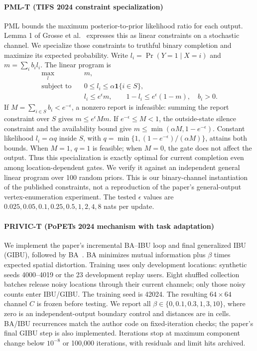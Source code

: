 \documentclass[3p,times]{elsarticle}
\newcommand{\ind}{\mathbf{1}}
\begin{document}
\paragraph{PML-T (TIFS 2024 constraint specialization)}
PML bounds the maximum posterior-to-prior likelihood ratio for each output. Lemma 1 of Grosse et al.~\cite{pml2024} expresses this as linear constraints on a stochastic channel. We specialize those constraints to truthful binary completion and maximize its expected probability. Write $l_i=\Pr(Y=1\mid X=i)$ and $m=\sum_i b_i l_i$. The linear program is
\begin{equation}
\begin{aligned}
 \max_l\quad & m,\\
 \text{subject to}\quad &0\le l_i\le\alpha\ind\{i\in S\},\\
 &l_i\le e^\epsilon m,\qquad 1-l_i\le e^\epsilon(1-m),\quad b_i>0.
\end{aligned}
\label{eq:pml}
\end{equation}
If $M=\sum_{i\in S}b_i<e^{-\epsilon}$, a nonzero report is infeasible: summing the report constraint over $S$ gives $m\le e^\epsilon M m$. If $e^{-\epsilon}\le M<1$, the outside-state silence constraint and the availability bound give $m\le\min(\alpha M,1-e^{-\epsilon})$. Constant likelihood $l_i=\alpha q$ inside $S$, with $q=\min\{1,(1-e^{-\epsilon})/(\alpha M)\}$, attains both bounds. When $M=1$, $q=1$ is feasible; when $M=0$, the gate does not affect the output. Thus this specialization is exactly optimal for current completion even among location-dependent gates. We verify it against an independent general linear program over 100 random priors. This is our binary-channel instantiation of the published constraints, not a reproduction of the paper's general-output vertex-enumeration experiment. The tested $\epsilon$ values are $0.025,0.05,0.1,0.25,0.5,1,2,4,8$ nats per update.

\paragraph{PRIVIC-T (PoPETs 2024 mechanism with task adaptation)}
We implement the paper's incremental BA--IBU loop and final generalized IBU (GIBU), followed by BA~\cite{privic2024}. BA minimizes mutual information plus $\beta$ times expected spatial distortion. Training uses only development locations: synthetic seeds 4000--4019 or the 23 development replay users. Eight shuffled collection batches release noisy locations through their current channels; only those noisy counts enter IBU/GIBU. The training seed is 42024. The resulting $64\times64$ channel $C$ is frozen before testing. We report all $\beta\in\{0,0.1,0.3,1,3,10\}$, where zero is an independent-output boundary control and distances are in cells. BA/IBU recurrences match the author code on fixed-iteration checks; the paper's final GIBU step is also implemented. Iterations stop at maximum component change below $10^{-8}$ or 100,000 iterations, with residuals and limit hits archived.
\end{document}
